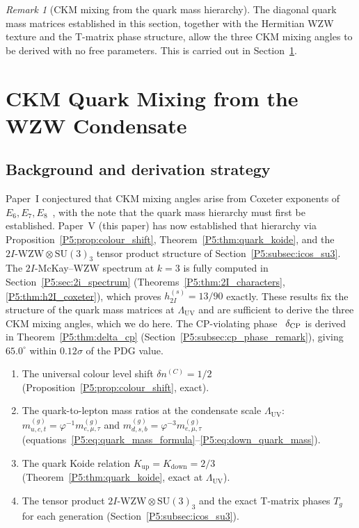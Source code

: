 \documentclass[11pt,a4paper]{article}
\theoremstyle{definition}
\theoremstyle{remark}
\newtheorem{remark}[theorem]{Remark}
\newcommand{\vp}{\varphi}
\newcommand{\LUV}{\Lambda_{\mathrm{UV}}}
\begin{document}
\begin{remark}[CKM mixing from the quark mass hierarchy]
\label{P5:rem:ckm_preview}
The diagonal quark mass matrices established in this section,
together with the Hermitian WZW texture and the T-matrix phase structure,
allow the three CKM mixing angles to be derived with no free parameters.
This is carried out in Section~\ref{P5:sec:ckm}.
\end{remark}

\section{CKM Quark Mixing from the WZW Condensate}
\label{P5:sec:ckm}

\subsection{Background and derivation strategy}

Paper~I conjectured that CKM mixing angles arise from Coxeter exponents
of $E_6,E_7,E_8$~\cite{Paper1}, with the note that the
quark mass hierarchy must first be established.  Paper~V (this paper)
has now established that hierarchy via Proposition~\ref{P5:prop:colour_shift},
Theorem~\ref{P5:thm:quark_koide}, and the $2I\text{-WZW}\otimes\mathrm{SU}(3)_3$
tensor product structure of Section~\ref{P5:subsec:icos_su3}.
The $2I$-McKay--WZW spectrum at $k=3$ is fully computed in
Section~\ref{P5:sec:2i_spectrum} (Theorems~\ref{P5:thm:2I_characters},
\ref{P5:thm:h2I_coxeter}), which proves $h_{2I}^{(s)}=13/90$ exactly.
These results fix the structure of the quark mass matrices at $\LUV$
and are sufficient to derive the three CKM mixing angles, which we do here.
The CP-violating phase~\cite{KM1973} $\delta_{\rm CP}$ is derived in
Theorem~\ref{P5:thm:delta_cp} (Section~\ref{P5:subsec:cp_phase_remark}),
giving $65.0^\circ$ within $0.12\sigma$ of the PDG value.

\begin{enumerate}[noitemsep,label=(\roman*)]
\item The universal colour level shift $\delta n^{(C)}=1/2$
  (Proposition~\ref{P5:prop:colour_shift}, exact).
\item The quark-to-lepton mass ratios at the condensate scale
  $\LUV$: $m_{u,c,t}^{(g)} = \vp^{-1}m_{e,\mu,\tau}^{(g)}$
  and $m_{d,s,b}^{(g)} = \vp^{-3}m_{e,\mu,\tau}^{(g)}$
  (equations~\eqref{P5:eq:quark_mass_formula}--\eqref{P5:eq:down_quark_mass}).
\item The quark Koide relation $K_{\mathrm{up}}=K_{\mathrm{down}}=2/3$
  (Theorem~\ref{P5:thm:quark_koide}, exact at $\LUV$).
\item The tensor product $2I\text{-WZW}\otimes\mathrm{SU}(3)_3$ and
  the exact T-matrix phases $T_g$ for each generation
  (Section~\ref{P5:subsec:icos_su3}).
\end{enumerate}
\end{document}
